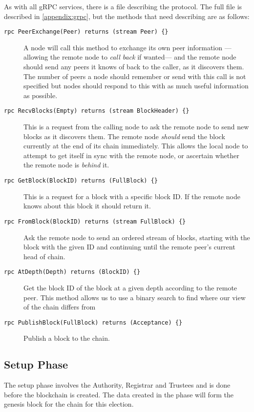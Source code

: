 As with all gRPC services, there is a file describing the protocol. The full file is described in \autoref{appendix:grpc}, but the methods that need describing are as follows:

\begin{description}
    \item[\texttt{rpc PeerExchange(Peer) returns (stream Peer) \{\}}] A node will call this method to exchange its own peer information ---allowing the remote node to \emph{call back} if wanted--- and the remote node should send any peers it knows of back to the caller, as it discovers them. The number of peers a node should remember or send with this call is not specified but nodes should respond to this with as much useful information as possible.
    \item[\texttt{rpc RecvBlocks(Empty) returns (stream BlockHeader) \{\}}] This is a request from the calling node to ask the remote node to send new blocks as it discovers them. The remote node \emph{should} send the block currently at the end of its chain immediately. This allows the local node to attempt to get itself in sync with the remote node, or ascertain whether the remote node is \emph{behind} it.
    \item[\texttt{rpc GetBlock(BlockID) returns (FullBlock) \{\}}] This is a request for a block with a specific block ID. If the remote node knows about this block it should return it.
    \item[\texttt{rpc FromBlock(BlockID) returns (stream FullBlock) \{\}}] Ask the remote node to send an ordered stream of blocks, starting with the block with the given ID and continuing until the remote peer's current head of chain.
    \item[\texttt{rpc AtDepth(Depth) returns (BlockID) \{\}}] Get the block ID of the block at a given depth according to the remote peer. This method allows us to use a binary search to find where our view of the chain differs from
    \item[\texttt{rpc PublishBlock(FullBlock) returns (Acceptance) \{\}}] Publish a block to the chain.
\end{description}


\subsection{Setup Phase}
\label{ch:astris:detail:setup}

The setup phase involves the Authority, Registrar and Trustees and is done before the blockchain is created. The data created in the phase will form the genesis block for the chain for this election.

